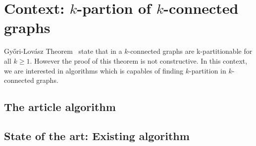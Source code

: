 \section{Context: $k$-partion of $k$-connected graphs}
Gy{\H o}ri-Lovász Theorem~\cite{GE78,LL77} state that in a $k$-connected graphs are 
k-partitionable for all $k \geq 1$. However the proof of this theorem
is not constructive. In this context, we are interested in algorithms which
is capables of finding $k$-partition in $k$-connected graphs.

\subsection{The article algorithm}

\subsection{State of the art: Existing algorithm}

